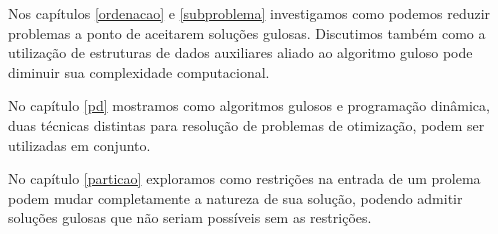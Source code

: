 Nos capítulos \ref{ordenacao} e \ref{subproblema} investigamos como podemos reduzir problemas a ponto de aceitarem soluções gulosas. Discutimos também como a utilização de estruturas de dados auxiliares aliado ao algoritmo guloso pode diminuir sua complexidade computacional.

No capítulo \ref{pd} mostramos como algoritmos gulosos e programação dinâmica, duas técnicas distintas para resolução de problemas de otimização, podem ser utilizadas em conjunto.

No capítulo \ref{particao} exploramos como restrições na entrada de um prolema podem mudar completamente a natureza de sua solução, podendo admitir soluções gulosas que não seriam possíveis sem as restrições.
